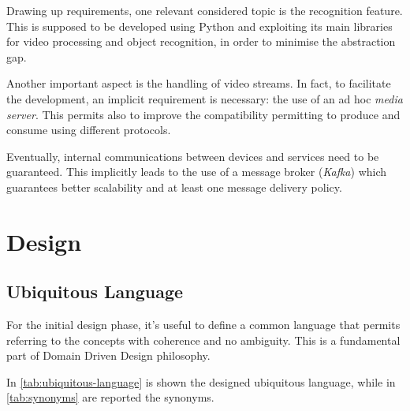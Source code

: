 \documentclass{scrartcl}
\begin{document}
    Drawing up requirements, one relevant considered topic is the recognition feature.
    This is supposed to be developed using Python and exploiting its main libraries for video processing and object recognition, in order to minimise the abstraction gap.

    Another important aspect is the handling of video streams.
    In fact, to facilitate the development, an implicit requirement is necessary: the use of an ad hoc \textit{media server}.
    This permits also to improve the compatibility permitting to produce and consume using different protocols.

    Eventually, internal communications between devices and services need to be guaranteed.
    This implicitly leads to the use of a message broker (\textit{Kafka}) which guarantees better scalability and at least one message delivery policy.


    \section{Design}

    \subsection{Ubiquitous Language}

    For the initial design phase, it's useful to define a common language that permits referring to the concepts with coherence and no ambiguity.
    This is a fundamental part of Domain Driven Design philosophy.

    In \cref{tab:ubiquitous-language} is shown the designed ubiquitous language, while in \cref{tab:synonyms} are reported the synonyms.
\end{document}
